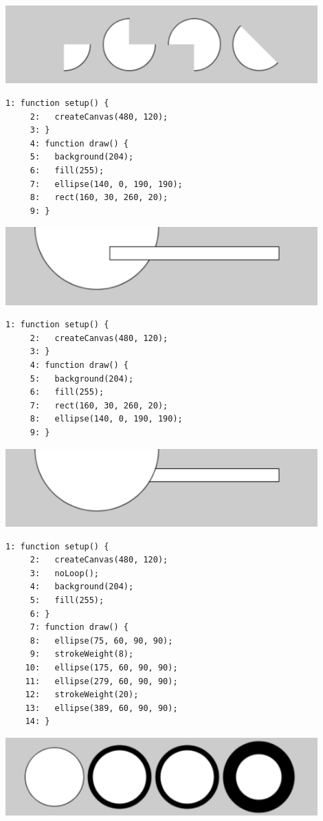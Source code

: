 \documentclass[a4j]{ltjsarticle}
\begin{document}
\includegraphics[height=3cm]{image/Ex_03_08.pdf}
\begin{lstlisting}[caption=Ex\_03\_09.js]
     1: function setup() {
     2:   createCanvas(480, 120);
     3: }
     4: function draw() {
     5:   background(204);
     6:   fill(255);
     7:   ellipse(140, 0, 190, 190);
     8:   rect(160, 30, 260, 20);
     9: }
\end{lstlisting}
\includegraphics[height=3cm]{image/Ex_03_09.pdf}
\begin{lstlisting}[caption=Ex\_03\_10.js]
     1: function setup() {
     2:   createCanvas(480, 120);
     3: }
     4: function draw() {
     5:   background(204);
     6:   fill(255);
     7:   rect(160, 30, 260, 20);
     8:   ellipse(140, 0, 190, 190);
     9: }
\end{lstlisting}
\includegraphics[height=3cm]{image/Ex_03_10.pdf}
\begin{lstlisting}[caption=Ex\_03\_11.js]
     1: function setup() {
     2:   createCanvas(480, 120);
     3:   noLoop();
     4:   background(204);
     5:   fill(255);
     6: } 
     7: function draw() {
     8:   ellipse(75, 60, 90, 90);
     9:   strokeWeight(8);
    10:   ellipse(175, 60, 90, 90);
    11:   ellipse(279, 60, 90, 90);
    12:   strokeWeight(20);
    13:   ellipse(389, 60, 90, 90);
    14: }
\end{lstlisting}
\includegraphics[height=3cm]{image/Ex_03_11.pdf}
\end{document}
